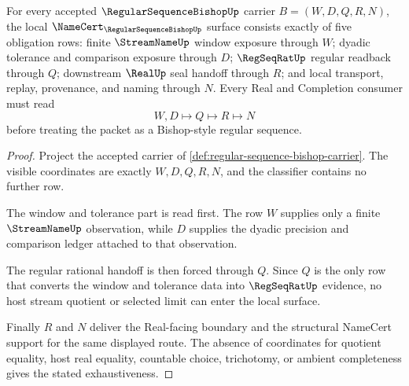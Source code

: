 \begin{theorem}
\label{thm:regular-sequence-bishop-namecert-obligations}
For every accepted $\RegularSequenceBishopUp$ carrier $B=(W,D,Q,R,N)$, the local $\NameCert_{\RegularSequenceBishopUp}$ surface consists exactly of five obligation rows: finite $\StreamNameUp$ window exposure through $W$; dyadic tolerance and comparison exposure through $D$; $\RegSeqRatUp$ regular readback through $Q$; downstream $\RealUp$ seal handoff through $R$; and local transport, replay, provenance, and naming through $N$. Every Real and Completion consumer must read
$$
W,D \longmapsto Q \longmapsto R \longmapsto N
$$
before treating the packet as a Bishop-style regular sequence.
\end{theorem}
\begin{proof}
Project the accepted carrier of \autoref{def:regular-sequence-bishop-carrier}. The visible coordinates are exactly $W,D,Q,R,N$, and the classifier contains no further row.

The window and tolerance part is read first. The row $W$ supplies only a finite $\StreamNameUp$ observation, while $D$ supplies the dyadic precision and comparison ledger attached to that observation.

The regular rational handoff is then forced through $Q$. Since $Q$ is the only row that converts the window and tolerance data into $\RegSeqRatUp$ evidence, no host stream quotient or selected limit can enter the local surface.

Finally $R$ and $N$ deliver the Real-facing boundary and the structural NameCert support for the same displayed route. The absence of coordinates for quotient equality, host real equality, countable choice, trichotomy, or ambient completeness gives the stated exhaustiveness.
\end{proof}


